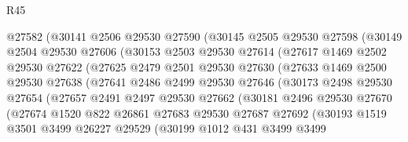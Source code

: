 \begin{lexlean}{R45}
\begin{coremodule}
                @27582
                (@30141
                  @2506
                  @29530
                  @27590
                  (@30145
                    @2505
                    @29530
                    @27598
                    (@30149
                      @2504
                      @29530
                      @27606
                      (@30153
                        @2503
                        @29530
                        @27614
                        (@27617
                          @1469
                          @2502
                          @29530
                          @27622
                          (@27625
                            @2479
                            @2501
                            @29530
                            @27630
                            (@27633
                              @1469
                              @2500
                              @29530
                              @27638
                              (@27641
                                @2486
                                @2499
                                @29530
                                @27646
                                (@30173
                                  @2498
                                  @29530
                                  @27654
                                  (@27657
                                    @2491
                                    @2497
                                    @29530
                                    @27662
                                    (@30181
                                      @2496
                                      @29530
                                      @27670
                                      (@27674
                                        @1520
                                        @822
                                        @26861
                                        @27683
                                        @29530
                                        @27687
                                        @27692
                                        (@30193
                                          @1519
                                          @3501
                                          @3499
                                          @26227
                                          @29529
                                          (@30199
                                            @1012
                                            @431
                                            @3499
                                            @3499

\end{coremodule}
\end{lexlean}
